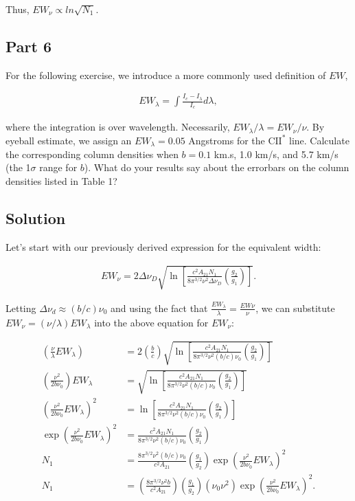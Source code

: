 \documentclass[12pt]{article}
\begin{document}
Thus, $EW_\nu \propto ln\sqrt{N_1}$.

\subsection*{Part 6}

For the following exercise, we introduce a more commonly used definition of $EW$,

\begin{align*}
EW_\lambda = \int\frac{I_c - I_\lambda}{I_c}d\lambda,
\end{align*}

where the integration is over wavelength. Necessarily, $EW_\lambda/\lambda = EW_\nu/\nu$. By eyeball estimate, we assign an $EW_\lambda = 0.05$ Angstroms for the $\mathrm{CII^*}$ line. Calculate the corresponding column densities when $b = 0.1$ km.s, 1.0 km/s, and 5.7 km/s (the 1$\sigma$ range for $b$). What do your results say about the errorbars on the column densities listed in Table 1?

\subsection*{Solution}

Let's start with our previously derived expression for the equivalent width:

\begin{align*}
EW_\nu = 2\Delta\nu_D\sqrt{\ln\left[\frac{c^2A_{21}N_1}{8\pi^{3/2}\nu^2\Delta\nu_D}\left(\frac{g_2}{g_1}\right)\right]}.
\end{align*}

Letting $\Delta\nu_d \approx (b/c)\nu_0$ and using the fact that $\frac{EW_\lambda}{\lambda} = \frac{EW\nu}{\nu}$, we can substitute $EW_\nu = (\nu/\lambda)EW_\lambda$ into the above equation for $EW_\nu$:

\begin{equation*}
\begin{split}
\left(\frac{\nu}{\lambda}EW_\lambda\right) &= 2\left(\frac{b}{c}\right)\sqrt{\ln\left[\frac{c^2A_{21}N_1}{8\pi^{3/2}\nu^2(b/c)\nu_0}\left(\frac{g_2}{g_1}\right)\right]}\\
\left(\frac{\nu^2}{2b\nu_0}\right)EW_\lambda &= \sqrt{\ln\left[\frac{c^2A_{21}N_1}{8\pi^{3/2}\nu^2(b/c)\nu_0}\left(\frac{g_2}{g_1}\right)\right]}\\
\left(\frac{\nu^2}{2b\nu_0}EW_\lambda\right)^2 &= \ln\left[\frac{c^2A_{21}N_1}{8\pi^{3/2}\nu^2(b/c)\nu_0}\left(\frac{g_2}{g_1}\right)\right]\\
\exp\left(\frac{\nu^2}{2b\nu_0}EW_\lambda\right)^2 &= \frac{c^2A_{21}N_1}{8\pi^{3/2}\nu^2(b/c)\nu_0}\left(\frac{g_2}{g_1}\right)\\
N_1 &= \frac{8\pi^{3/2}\nu^2(b/c)\nu_0}{c^2A_{21}}\left(\frac{g_1}{g_2}\right)\exp\left(\frac{\nu^2}{2b\nu_0}EW_\lambda\right)^2\\
N_1 &= \left(\frac{8\pi^{3/2}\nu^2b}{c^2A_{21}}\right)\left(\frac{g_1}{g_2}\right)(\nu_0\nu^2)\exp\left(\frac{\nu^2}{2b\nu_0}EW_\lambda\right)^2.
\end{split}
\end{equation*}
\end{document}
